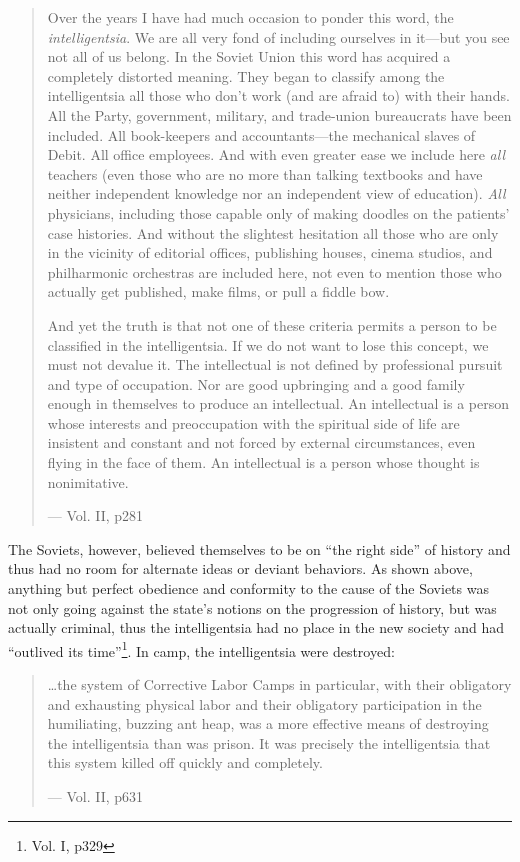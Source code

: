 \documentclass{article}
\begin{document}
\begin{quote}
Over the years I have had much occasion to ponder this word, the \emph{intelligentsia}.  We are all very fond of including ourselves in it---but you see not all of us belong.  In the Soviet Union this word has acquired a completely distorted meaning.  They began to classify among the intelligentsia all those who don't work (and are afraid to) with their hands.  All the Party, government, military, and trade-union bureaucrats have been included.  All book-keepers and accountants---the mechanical slaves of Debit.  All office employees.  And with even greater ease we include here \emph{all} teachers (even those who are no more than talking textbooks and have neither independent knowledge nor an independent view of education).  \emph{All} physicians, including those capable only of making doodles on the patients' case histories.  And without the slightest hesitation all those who are only in the vicinity of editorial offices, publishing houses, cinema studios, and philharmonic orchestras are included here, not even to mention those who actually get published, make films, or pull a fiddle bow.

And yet the truth is that not one of these criteria permits a person to be classified in the intelligentsia.  If we do not want to lose this concept, we must not devalue it.  The intellectual is not defined by professional pursuit and type of occupation.  Nor are good upbringing and a good family enough in themselves to produce an intellectual.  An intellectual is a person whose interests and preoccupation with the spiritual side of life are insistent and constant and not forced by external circumstances, even flying in the face of them.  An intellectual is a person whose thought is nonimitative.

--- Vol. II, p281
\end{quote}

The Soviets, however, believed themselves to be on ``the right side'' of history and thus had no room for alternate ideas or deviant behaviors.  As shown above, anything but perfect obedience and conformity to the cause of the Soviets was not only going against the state's notions on the progression of history, but was actually criminal, thus the intelligentsia had no place in the new society and had ``outlived its time''\footnote{Vol. I, p329}.  In camp, the intelligentsia were destroyed:

\begin{quote}
\ldots the system of Corrective Labor Camps in particular, with their obligatory and exhausting physical labor and their obligatory participation in the humiliating, buzzing ant heap, was a more effective means of destroying the intelligentsia than was prison.  It was precisely the intelligentsia that this system killed off quickly and completely.

--- Vol. II, p631
\end{quote}
\end{document}

